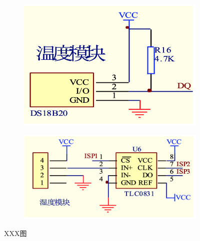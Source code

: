 \documentclass{thxythesis}
\begin{document}
\begin{Appendix}
\begin{figure}[H]
    \begin{subfigure}{0.45\linewidth}
        \includegraphics[scale=0.6]{static/1.png}
        \label{fig:sub-1-append}
    \end{subfigure}
    \begin{subfigure}{0.5\linewidth}
        \includegraphics[scale=0.6]{static/2.png}
        \label{fig:sub-2-append}
    \end{subfigure}
    \centerline{}
    \caption{XXX图}
    \label{fig:circuit-diagram-append}
\end{figure}
\end{Appendix}
\end{document}
